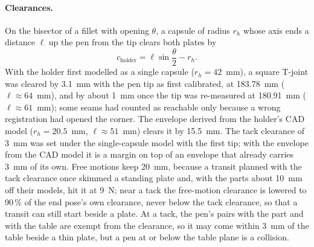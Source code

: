 \paragraph{Clearances.} On the bisector of a fillet with opening $\theta$, a capsule of radius $r_h$
whose axis ends a distance $\ell$ up the pen from the tip clears both plates by
\begin{equation}
c_{\mathrm{holder}}=\ell\sin\frac{\theta}{2}-r_h .
\label{eq:holder_clearance}
\end{equation}
With the holder first modelled as a single capsule ($r_h=42$~mm), a square T-joint was cleared by
3.1~mm with the pen tip as first calibrated, at 183.78~mm ($\ell\approx64$~mm), and by about 1~mm once
the tip was re-measured at 180.91~mm ($\ell\approx61$~mm); some seams had counted as reachable only
because a wrong registration had opened the corner. The envelope derived from the holder's CAD model
($r_h=20.5$~mm, $\ell\approx51$~mm) clears it by 15.5~mm. The tack clearance of 3~mm was set under the
single-capsule model with the first tip; with the envelope from the CAD model it is a margin on top of
an envelope that already carries 3~mm of its own. Free motions keep 20~mm, because a transit planned with the tack clearance
once skimmed a standing plate and, with the parts about 10~mm off their models, hit it at 9~N; near a
tack the free-motion clearance is lowered to 90\,\% of the end pose's own clearance, never below the
tack clearance, so that a transit can still start beside a plate. At a tack, the pen's pairs with the part
and with the table are exempt from the clearance, so it may come within 3~mm of the table beside a thin
plate, but a pen at or below the table plane is a collision.

